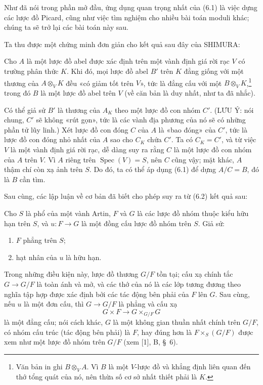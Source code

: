Như đã nói trong phần mở đầu, ứng dụng quan trọng nhất của (6.1) là việc dựng
các lược đồ Picard, cũng như việc tìm nghiệm cho nhiều bài toán moduli khác;
chúng ta sẽ trở lại các bài toán này sau.

Ta thu được một chứng minh đơn giản cho kết quả sau đây của SHIMURA:

 Cho $A$ là một lược đồ abel được xác định trên một vành
định giá rời rạc $V$ có trường phân thức $K$. Khi đó, mọi lược đồ abel $B'$
trên $K$ đẳng giống với một thương của $A\otimes_V K$ đều «có giảm tốt trên
$V$», tức là đẳng cấu với một $B\otimes_V K$,\footnote{Văn bản in ghi
$B\otimes_V A$. Vì $B$ là một $V$-lược đồ và khẳng định liên quan đến thớ
tổng quát của nó, nên thừa số cơ sở nhất thiết phải là $K$.} trong đó $B$ là
một lược đồ abel trên $V$ (về căn bản là duy nhất, như ta đã nhắc).

Có thể giả sử $B'$ là thương của $A_K$ theo một lược đồ con nhóm $C'$.
(LƯU Ý: nói chung, $C'$ sẽ không «rút gọn», tức là các vành địa phương của nó
sẽ có những phần tử lũy linh.) Xét lược đồ con đóng $C$ của $A$ là «bao đóng»
của $C'$, tức là lược đồ con đóng nhỏ nhất của $A$ sao cho $C_K$ chứa $C'$.
Ta có $C_K=C'$, và từ việc $V$ là một vành định giá rời rạc, dễ dàng suy ra
rằng $C$ là một lược đồ con nhóm của $A$ trên $V$. Vì $A$ riêng trên
$\operatorname{Spec}(V)=S$, nên $C$ cũng vậy; mặt khác, $A$ thậm chí còn xạ
ảnh trên $S$. Do đó, ta có thể áp dụng (6.1) để dựng $A/C=B$,
đó là $B$ cần tìm.

Sau cùng, các lập luận về cơ bản đã biết cho phép suy ra từ (6.2) kết quả sau:

 Cho $S$ là phổ của một vành Artin, $F$ và $G$ là các
lược đồ nhóm thuộc kiểu hữu hạn trên $S$, và $u:F\to G$ là một đồng cấu lược
đồ nhóm trên $S$. Giả sử:
\begin{enumerate}
\item[(i)] $F$ phẳng trên $S$;
\item[(ii)] hạt nhân của $u$ là hữu hạn.
\end{enumerate}
Trong những điều kiện này, lược đồ thương $G/F$ tồn tại; cấu xạ chính tắc
$G\to G/F$ là toàn ánh và mở, và các thớ của nó là các lớp tương đương theo
nghĩa tập hợp được xác định bởi các tác động bên phải của $F$ lên $G$. Sau
cùng, nếu $u$ là một đơn cấu, thì $G\to G/F$ là phẳng và cấu xạ
\[
  G\times F\longrightarrow G\times_{G/F}G
\]
là một đẳng cấu; nói cách khác, $G$ là một không gian thuần nhất chính trên
$G/F$, có nhóm cấu trúc (tác động bên phải) là $F$, hay đúng hơn là
$F\times_S(G/F)$ được xem như một lược đồ nhóm trên $G/F$ (xem [1], B,
\S~6).

